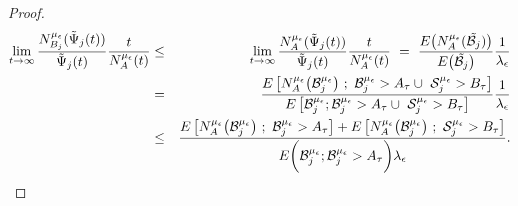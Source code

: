 \begin{proof}
\vspace{-4mm}
{\small\begin{eqnarray*}
		\lim_{t \to \infty} \frac{N_{B_j}^{{\mu_\epsilon}}( {\tilde \Psi}_{j} (t))}{{\tilde \Psi}_{j} (t)} \frac{t}{N_A^{{\mu_\epsilon}}(t)} &\le &
				\lim_{t \to \infty} \frac{N_{A}^{{\mu_\epsilon}}( {\tilde \Psi}_{j} (t))}{{\tilde \Psi}_{j} (t)} \frac{t}{N_A^{{\mu_\epsilon}}(t)}
	\ =  \   \frac{E\big(  N^{{\mu_\epsilon}}_A(\tilde{\mathcal{B}_j})  \big)}{E\big(\tilde{\mathcal{B}_j} \big)} \frac{1}{\lambda_\epsilon} \\  &=&  
		\frac{E \left[ N^{{\mu_\epsilon}}_A \big( \mathcal{ B}_j^{\mu_\epsilon} \big) \ ; \  \mathcal{ B}_j^{\mu_\epsilon} > A_\tau \cup \  \mathcal{S}_j^{\mu_\epsilon}  >   B_\tau  \right]}{E \left[ \mathcal{ B}_j^{\mu_\epsilon} ;  \mathcal{ B}_j^{\mu_\epsilon} > A_\tau \cup \  \mathcal{S}_j^{\mu_\epsilon}  >   B_\tau  \right] } \frac{1}{\lambda_\epsilon}\\
		&\leq & \frac{E \left[ N^{{\mu_\epsilon}}_A \big( \mathcal{ B}_j^{\mu_\epsilon} \big) \ ; \  \mathcal{ B}_j^{\mu_\epsilon} > A_\tau \right] + E \left[  N^{{\mu_\epsilon}}_A \big( \mathcal{ B}_j^{\mu_\epsilon} \big) \ ; \  \mathcal{S}_j^{\mu_\epsilon}  >   B_\tau  \right]}{E \bigg(  \mathcal{ B}_j^{\mu_\epsilon} ;   \mathcal{ B}_j^{\mu_\epsilon} > A_\tau \bigg) \lambda_\epsilon } .
\end{eqnarray*}}
%





\end{proof}
